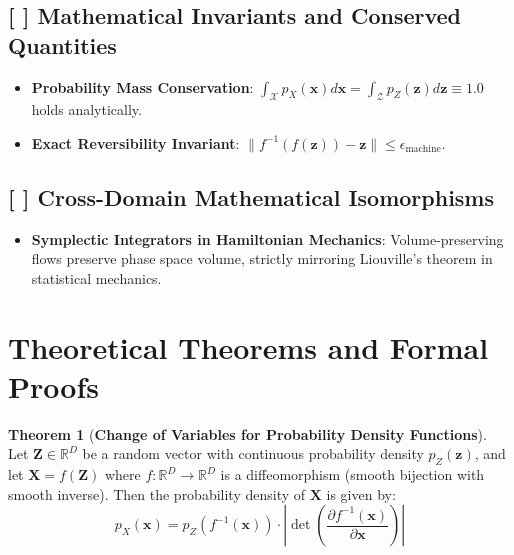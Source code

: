 \documentclass[11pt,a4paper]{article}
\theoremstyle{definition}
\newtheorem{theorem}{\textbf{Theorem}}[section]
\begin{document}
\subsection{[ ] Mathematical Invariants and Conserved Quantities}
\begin{itemize}
    \item \textbf{Probability Mass Conservation}: $\int_{\mathcal{X}} p_X(\mathbf{x}) d\mathbf{x} = \int_{\mathcal{Z}} p_Z(\mathbf{z}) d\mathbf{z} \equiv 1.0$ holds analytically.
    \item \textbf{Exact Reversibility Invariant}: $\|f^{-1}(f(\mathbf{z})) - \mathbf{z}\| \le \epsilon_{\text{machine}}$.
\end{itemize}

\subsection{[ ] Cross-Domain Mathematical Isomorphisms}
\begin{itemize}
    \item \textbf{Symplectic Integrators in Hamiltonian Mechanics}: Volume-preserving flows preserve phase space volume, strictly mirroring Liouville's theorem in statistical mechanics.
\end{itemize}

\section{Theoretical Theorems and Formal Proofs}

\begin{theorem}[\textbf{Change of Variables for Probability Density Functions}]
Let $\mathbf{Z} \in \mathbb{R}^D$ be a random vector with continuous probability density $p_Z(\mathbf{z})$, and let $\mathbf{X} = f(\mathbf{Z})$ where $f: \mathbb{R}^D \to \mathbb{R}^D$ is a diffeomorphism (smooth bijection with smooth inverse). Then the probability density of $\mathbf{X}$ is given by:
{\boldmath
\begin{equation}
p_X(\mathbf{x}) = p_Z(f^{-1}(\mathbf{x})) \cdot \left| \det \left( \frac{\partial f^{-1}(\mathbf{x})}{\partial \mathbf{x}} \right) \right|
\end{equation}
}
\end{theorem}
\end{document}
